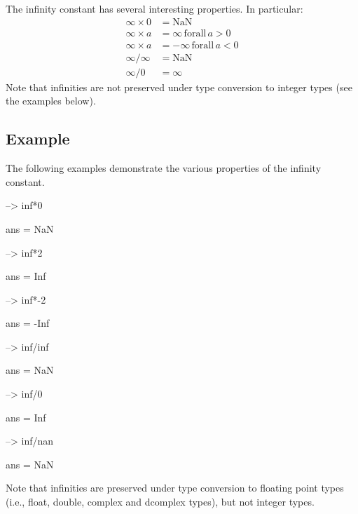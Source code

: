 The infinity constant has several interesting properties. In particular\-: \[ \begin{array}{ll} \infty \times 0 & = \mathrm{NaN} \\ \infty \times a & = \infty \, \mathrm{for all} \, a > 0 \\ \infty \times a & = -\infty \, \mathrm{for all} \, a < 0 \\ \infty / \infty & = \mathrm{NaN} \\ \infty / 0 & = \infty \end{array} \] Note that infinities are not preserved under type conversion to integer types (see the examples below). \hypertarget{variables_struct_Example}{}\subsection{Example}\label{variables_struct_Example}
The following examples demonstrate the various properties of the infinity constant.


\begin{DoxyVerbInclude}
--> inf*0

ans = 
 NaN 

--> inf*2

ans = 
 Inf 

--> inf*-2

ans = 
 -Inf 

--> inf/inf

ans = 
 NaN 

--> inf/0

ans = 
 Inf 

--> inf/nan

ans = 
 NaN 
\end{DoxyVerbInclude}


Note that infinities are preserved under type conversion to floating point types (i.\-e., {\ttfamily float}, {\ttfamily double}, {\ttfamily complex} and {\ttfamily dcomplex} types), but not integer types.


